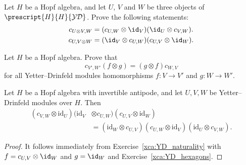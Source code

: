 \documentclass[12pt]{amsproc}
\newcommand{\ydH}{\prescript{H}{H}{\mathcal{YD}}}
\begin{document}
\begin{exercise}
\label{xca:YD_hexagons}
Let $H$ be a Hopf algebra, and let $U$, $V$ and $W$
be three objects of $\ydH$. Prove the following statements: 
\begin{align}
c_{U\otimes V,W} & =(c_{U,W}\otimes\id_{V})(\id_{U}\otimes c_{V,W}).\label{eq:(cx1)(1xc)}\\
c_{U,V\otimes W} & =(\id_{V}\otimes c_{U,W})(c_{U,V}\otimes\id_{W})\label{eq:(1xc)(cx1)}.
\end{align}
\end{exercise}

\begin{exercise}
\label{xca:YD_naturality}
Let $H$ be a Hopf algebra. Prove that 
\[
c_{V',W'}(f\otimes g)=(g\otimes f)c_{W,V}
\]
for all Yetter--Drinfeld modules homomorphisms $f:V\to V'$ and $g:W\to W'$. 
\end{exercise}

\begin{theorem}
\label{theorem:YD_braid_equation}
Let $H$ be a Hopf algebra with invertible antipode, and let $U,V,W$
be Yetter--Drinfeld modules over $H$. Then 
\begin{align*}
(c_{V,W}\otimes\textrm{id}_{U})(\textrm{id}_{V}&\otimes c_{U,W})(c_{U,V}\otimes\textrm{id}_{W})\\
&=(\textrm{id}_{W}\otimes c_{U,V})(c_{U,W}\otimes\textrm{id}_{V})(\textrm{id}_{U}\otimes c_{V,W}).
\end{align*}
\end{theorem}

\begin{proof} 
It follows immediately from Exercise~\ref{xca:YD_naturality} with
$f=c_{U,V}\otimes\id_W$ and $g=\id_W$ and Exercise~\ref{xca:YD_hexagons}.
\end{proof}

\end{document}
